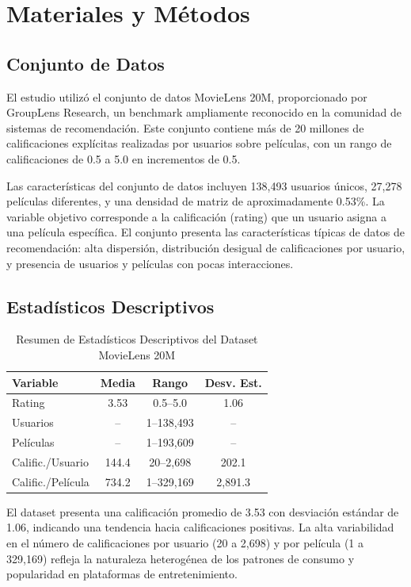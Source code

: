 \documentclass[conference]{IEEEtran}
\begin{document}
\section{Materiales y Métodos}

\subsection{Conjunto de Datos}

El estudio utilizó el conjunto de datos MovieLens 20M, proporcionado por GroupLens Research, un benchmark ampliamente reconocido en la comunidad de sistemas de recomendación. Este conjunto contiene más de 20 millones de calificaciones explícitas realizadas por usuarios sobre películas, con un rango de calificaciones de 0.5 a 5.0 en incrementos de 0.5.

Las características del conjunto de datos incluyen 138,493 usuarios únicos, 27,278 películas diferentes, y una densidad de matriz de aproximadamente 0.53\%. La variable objetivo corresponde a la calificación (rating) que un usuario asigna a una película específica. El conjunto presenta las características típicas de datos de recomendación: alta dispersión, distribución desigual de calificaciones por usuario, y presencia de usuarios y películas con pocas interacciones.

\subsection{Estadísticos Descriptivos}

\begin{table}[htbp]
\caption{Resumen de Estadísticos Descriptivos del Dataset MovieLens 20M}
\centering
\small
\begin{tabular}{|l|c|c|c|}
\hline
\textbf{Variable} & \textbf{Media} & \textbf{Rango} & \textbf{Desv. Est.} \\
\hline
Rating         & 3.53  & 0.5--5.0     & 1.06 \\
Usuarios       & --    & 1--138,493   & --   \\
Películas      & --    & 1--193,609   & --   \\
Calific./Usuario & 144.4 & 20--2,698   & 202.1 \\
Calific./Película & 734.2 & 1--329,169 & 2,891.3 \\
\hline
\end{tabular}
\label{tab:descriptivos}
\end{table}

El dataset presenta una calificación promedio de 3.53 con desviación estándar de 1.06, indicando una tendencia hacia calificaciones positivas. La alta variabilidad en el número de calificaciones por usuario (20 a 2,698) y por película (1 a 329,169) refleja la naturaleza heterogénea de los patrones de consumo y popularidad en plataformas de entretenimiento.
\end{document}
